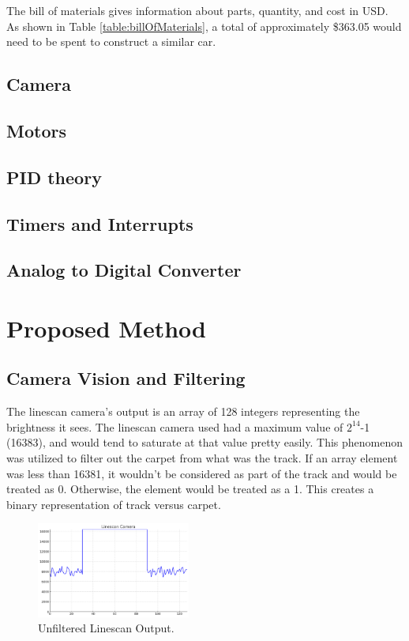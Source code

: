 \documentclass[conference]{IEEEtran}
\begin{document}
The bill of materials gives information about parts, quantity, and cost in USD. As shown in Table \ref{table:billOfMaterials}, a total of approximately \$363.05 would need to be spent to construct a similar car.

\subsection{Camera}

\subsection{Motors}

\subsection{PID theory}

\subsection{Timers and Interrupts}

\subsection{Analog to Digital Converter}

\section{Proposed Method}

\subsection{Camera Vision and Filtering}

The linescan camera's output is an array of 128 integers representing the brightness it sees. The linescan camera used had a maximum value of $2^{14}$-1 (16383), and would tend to saturate at that value pretty easily. This phenomenon was utilized to filter out the carpet from what was the track. If an array element was less than 16381, it wouldn't be considered as part of the track and would be treated as 0. Otherwise, the element would be treated as a 1. This creates a binary representation of track versus carpet. 

\begin{figure}[htbp]
	\centerline{\includegraphics[width=0.45\textwidth]{images/linescan.png}}
	\caption{Unfiltered Linescan Output.}
	\label{fig:linescan}
\end{figure}
\end{document}
